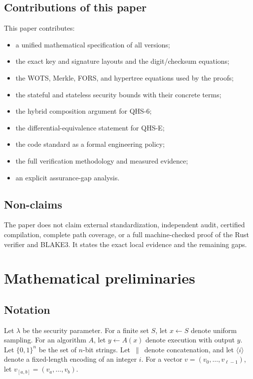 \documentclass[11pt,a4paper]{article}
\theoremstyle{remark}
\newcommand{\concat}{\,\|\,}
\newcommand{\bits}{\{0,1\}}
\begin{document}
\subsection{Contributions of this paper}

This paper contributes:

\begin{itemize}
  \item a unified mathematical specification of all versions;
  \item the exact key and signature layouts and the digit/checksum equations;
  \item the WOTS, Merkle, FORS, and hypertree equations used by the proofs;
  \item the stateful and stateless security bounds with their concrete terms;
  \item the hybrid composition argument for QHS-6;
  \item the differential-equivalence statement for QHS-E;
  \item the code standard as a formal engineering policy;
  \item the full verification methodology and measured evidence;
  \item an explicit assurance-gap analysis.
\end{itemize}

\subsection{Non-claims}

The paper does not claim external standardization, independent audit, certified
compilation, complete path coverage, or a full machine-checked proof of the Rust
verifier and BLAKE3. It states the exact local evidence and the remaining gaps.

\section{Mathematical preliminaries}

\subsection{Notation}

Let \(\lambda\) be the security parameter. For a finite set \(S\), let
\(x\leftarrow S\) denote uniform sampling. For an algorithm \(A\), let
\(y\leftarrow A(x)\) denote execution with output \(y\). Let
\(\bits^n\) be the set of \(n\)-bit strings. Let \(\concat\) denote
concatenation, and let \(\langle i\rangle\) denote a fixed-length encoding of an
integer \(i\). For a vector \(v=(v_0,\dots,v_{\ell-1})\), let
\(v_{[a,b]}=(v_a,\dots,v_b)\).
\end{document}
